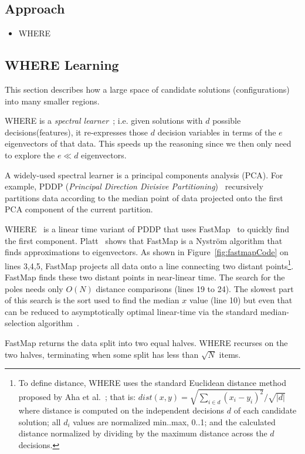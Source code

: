 \documentclass{sig-alternative}
\newcommand{\bi}{\begin{itemize}[leftmargin=0.4cm]}
\newcommand{\ei}{\end{itemize}}
\newcommand{\fig}[1]{Figure~\ref{fig:#1}}
\begin{document}
\subsection{Approach}
\bi
    \item{WHERE}
\ei
\subsection{WHERE Learning}\label{sec:spectral}
This section describes how a large space of candidate solutions (configurations) into many smaller regions.

WHERE is a {\em spectral learner}~\cite{kamvar2003spectral}; i.e. given solutions with $d$ possible decisions(features), it re-expresses those $d$ decision variables in terms of the $e$ eigenvectors of that data.
This speeds up the reasoning since we then only need to explore the $e\ll d$   eigenvectors.

A widely-used spectral learner is a principal components analysis (PCA). For example, PDDP ({\em Principal Direction Divisive Partitioning})~\cite{boley1998principal} recursively partitions data according to the median point of data projected onto the first PCA component of the current partition.

WHERE~\cite{me12d} is a linear time variant of PDDP  that uses FastMap~\cite{Faloutsos1995} to quickly find the first component.
Platt~\cite{platt05} shows that FastMap is a  Nystr\"om algorithm that finds approximations to eigenvectors.
As shown in \fig{fastmapCode} on lines 3,4,5, FastMap  projects all data onto a line connecting two distant points\footnote{
To define distance, WHERE uses the standard Euclidean distance method proposed by Aha et al.~\cite{aha91}; that is: $dist(x,y)= \sqrt{\sum_{i\in d} (x_i - y_i)^2}/\sqrt{ \left\vert{d}\right\vert }$ where distance is computed on the independent decisions $d$ of each candidate solution; all $d_i$ values are normalized min..max, 0..1; and the calculated distance normalized by dividing by the maximum distance across the $d$ decisions.}. 
FastMap finds these two distant points in near-linear time. 
The search for the poles needs only $O(N)$ distance comparisons (lines 19 to 24).
The slowest part of this search is the sort used to find the median $x$ value (line 10) but even that can be reduced to  asymptotically optimal linear-time via the standard median-selection algorithm~\cite{hoare61}.

FastMap returns the data split into two equal halves.
WHERE recurses on the two halves, terminating when some split has less than $\sqrt{N}$ items.
\end{document}
